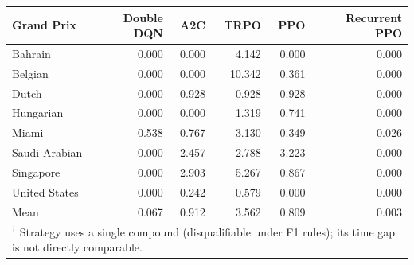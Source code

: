 \begin{tabular}{lrrrrr}
\toprule
Grand Prix & Double DQN & A2C & TRPO & PPO & Recurrent PPO \\
\midrule
Bahrain & 0.000 & 0.000 & 4.142 & 0.000 & 0.000 \\
Belgian & 0.000 & 0.000 & 10.342 & 0.361 & 0.000 \\
Dutch & 0.000 & 0.928 & 0.928 & 0.928 & 0.000 \\
Hungarian & 0.000 & 0.000 & 1.319 & 0.741 & 0.000 \\
Miami & 0.538 & 0.767 & 3.130 & 0.349 & 0.026 \\
Saudi Arabian & 0.000 & 2.457 & 2.788 & 3.223 & 0.000 \\
Singapore & 0.000 & 2.903 & 5.267 & 0.867 & 0.000 \\
United States & 0.000 & 0.242 & 0.579 & 0.000 & 0.000 \\
\midrule
Mean & 0.067 & 0.912 & 3.562 & 0.809 & 0.003 \\
\bottomrule
\multicolumn{6}{l}{\footnotesize $^\dagger$ Strategy uses a single compound (disqualifiable under F1 rules); its time gap is not directly comparable.} \\
\end{tabular}